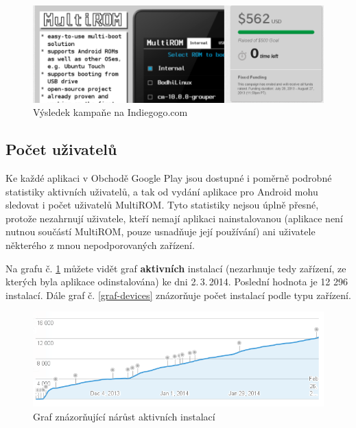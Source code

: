 \documentclass[12pt, a4paper, oneside]{article}
\newcommand{\B}{\textbf} %
\begin{document}
\begin{figure}[H]
\begin{center}
 \includegraphics[width=\textwidth]{img/indiegogo.png}
\caption{Výsledek kampaňe na Indiegogo.com}
\end{center}
\end{figure}

\subsection{Počet uživatelů}
Ke každé aplikaci v Obchodě Google Play jsou dostupné i poměrně podrobné statistiky aktivních uživatelů, a tak od vydání aplikace pro Android mohu sledovat i počet uživatelů MultiROM. Tyto statistiky nejsou úplně přesné, protože nezahrnují uživatele, kteří nemají aplikaci nainstalovanou (aplikace není nutnou součástí MultiROM, pouze usnadňuje její používání) ani uživatele některého z mnou nepodporovaných zařízení.

Na grafu č. \ref{graf-uzivatele} můžete vidět graf \B{aktivních} instalací (nezarhnuje tedy zařízení, ze kterých byla aplikace odinstalována) ke dni 2.\,3.\,2014. Poslední hodnota je 12 296 instalací. Dále graf č. \ref{graf-devices} znázorňuje počet instalací podle typu zařízení.

\begin{figure}[H]
\begin{center}
 \includegraphics[width=\textwidth]{img/graph_active.png}
\caption{Graf znázorňující nárůst aktivních instalací}
\label{graf-uzivatele}
\end{center}
\end{figure}
\end{document}
